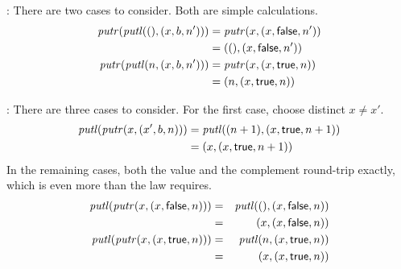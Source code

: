 \begin{defn}[$R$-similarity]
\begin{theorem}
\begin{lemma}
\begin{theorem}[No products]
\begin{lemma}
\begin{goodlens}
\noindent{}: There are two cases to consider. Both are simple calculations.
\begin{align*}
    \mathit{putr}(\mathit{putl}({()},(x,b,n')))
        &= \mathit{putr}(x,(x,\mathsf{false},n')) \\
        &= ({()},(x,\mathsf{false},n')) \\
    \mathit{putr}(\mathit{putl}( n,(x,b,n')))
        &= \mathit{putr}(x,(x,\mathsf{true},n)) \\
        &= ( n,(x,\mathsf{true},n))
\end{align*}

\noindent{}: There are three cases to consider. For the first case,
choose distinct $x \ne x'$.
\begin{align*}
    \mathit{putl}(\mathit{putr}(x,(x',b,n)))
        &= \mathit{putl}((n+1),(x,\mathsf{true},n+1)) \\
        &= (x,(x,\mathsf{true},n+1))
\end{align*}
In the remaining cases, both the value and the complement round-trip
exactly, which is even more than the  law requires.
\begin{eqnarray*}
    \mathit{putl}(\mathit{putr}(x,(x,\mathsf{false},n)))
        &=& \mathit{putl}({()},(x,\mathsf{false},n)) \\
        &=& (x,(x,\mathsf{false},n)) \\
    \mathit{putl}(\mathit{putr}(x,(x,\mathsf{true},n)))
        &=& \mathit{putl}( n,(x,\mathsf{true},n)) \\
        &=& (x,(x,\mathsf{true},n)) 
\end{eqnarray*}
\end{goodlens}
\fi



\end{lemma}
\end{theorem}
\end{lemma}
\end{theorem}
\end{defn}
